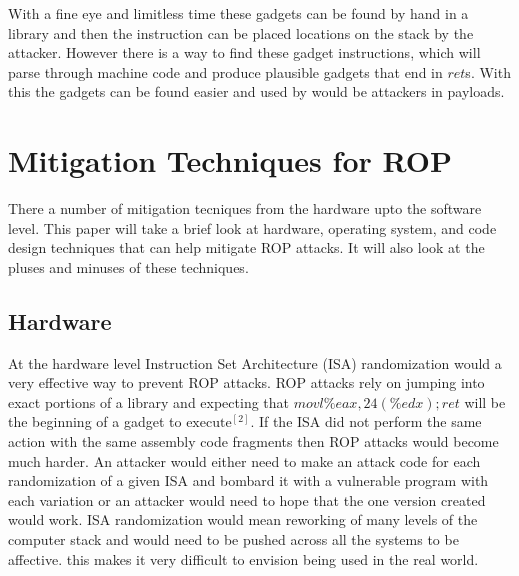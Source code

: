 \documentclass[11pt]{amsart}
\begin{document}
With a fine eye and limitless time these gadgets can be found by hand in a library and then the instruction can be placed locations on the stack by the attacker.  However there is a way to find these gadget instructions, which will parse through machine code and produce plausible gadgets that end in $ret$s.  With this the gadgets can be found easier and used by would be attackers in payloads.
\section*{Mitigation Techniques for ROP}
There a number of mitigation tecniques from the hardware upto the software level. This paper will take a brief look at hardware, operating system, and code design techniques that can help mitigate ROP attacks. It will also look at the pluses and minuses of these techniques.
\subsection*{Hardware}
At the hardware level Instruction Set Architecture (ISA) randomization would a very effective way to prevent ROP attacks. ROP attacks rely on jumping into exact portions of a library and expecting that $movl \%eax, 24(\%edx); ret$ will be the beginning of a gadget to $\text{execute}^{[2]}$. If the ISA did not perform the same action with the same assembly code fragments then ROP attacks would become much harder. An attacker would either need to make an attack code for each randomization of a given ISA and bombard it with a vulnerable program with each variation or an attacker would need to hope that the one version created would work. ISA randomization would mean reworking of many levels of the computer stack and would need to be pushed across all the systems to be affective. this makes it very difficult to envision being used in the real world.
\end{document}
